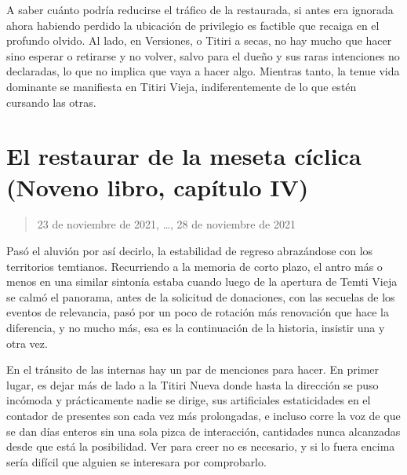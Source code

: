 \documentclass[
  spanish,
]{book}
\begin{document}
A saber cuánto podría reducirse el tráfico de la restaurada, si antes era ignorada ahora habiendo perdido la ubicación de privilegio es factible que recaiga en el profundo olvido. Al lado, en Versiones, o Titiri a secas, no hay mucho que hacer sino esperar o retirarse y no volver, salvo para el dueño y sus raras intenciones no declaradas, lo que no implica que vaya a hacer algo. Mientras tanto, la tenue vida dominante se manifiesta en Titiri Vieja, indiferentemente de lo que estén cursando las otras.

\hypertarget{el-restaurar-de-la-meseta-cuxedclica-noveno-libro-capuxedtulo-iv}{%
\section{El restaurar de la meseta cíclica (Noveno libro, capítulo IV)}\label{el-restaurar-de-la-meseta-cuxedclica-noveno-libro-capuxedtulo-iv}}

\begin{quote}
23 de noviembre de 2021, \ldots, 28 de noviembre de 2021
\end{quote}

Pasó el aluvión por así decirlo, la estabilidad de regreso abrazándose con los territorios temtianos. Recurriendo a la memoria de corto plazo, el antro más o menos en una similar sintonía estaba cuando luego de la apertura de Temti Vieja se calmó el panorama, antes de la solicitud de donaciones, con las secuelas de los eventos de relevancia, pasó por un poco de rotación más renovación que hace la diferencia, y no mucho más, esa es la continuación de la historia, insistir una y otra vez.

En el tránsito de las internas hay un par de menciones para hacer. En primer lugar, es dejar más de lado a la Titiri Nueva donde hasta la dirección se puso incómoda y prácticamente nadie se dirige, sus artificiales estaticidades en el contador de presentes son cada vez más prolongadas, e incluso corre la voz de que se dan días enteros sin una sola pizca de interacción, cantidades nunca alcanzadas desde que está la posibilidad. Ver para creer no es necesario, y si lo fuera encima sería difícil que alguien se interesara por comprobarlo.
\end{document}
